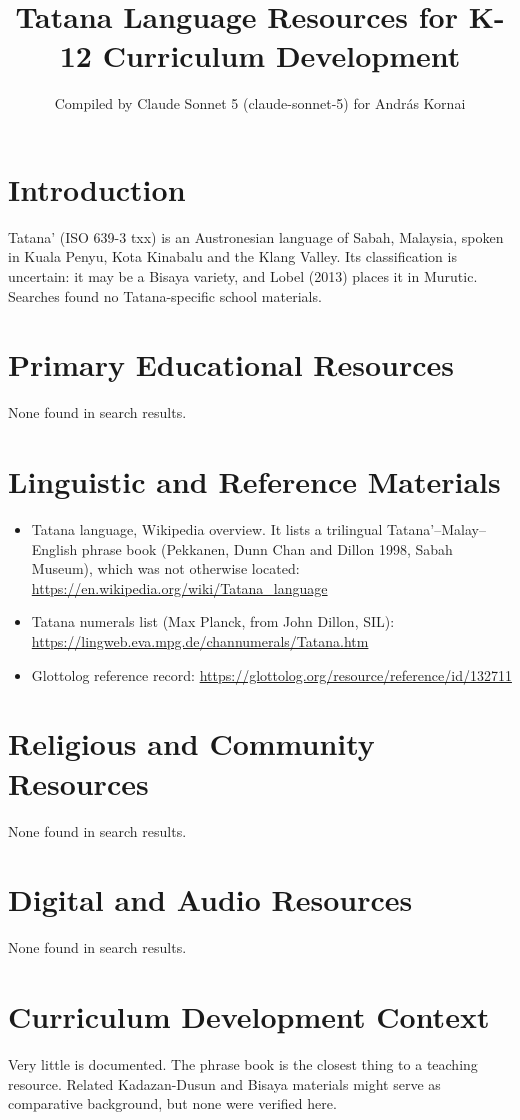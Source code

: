 \documentclass[12pt]{article}
\title{Tatana Language Resources for K-12 Curriculum Development}
\author{Compiled by Claude Sonnet 5 (claude-sonnet-5) for Andr\'as Kornai}
\date{}
\begin{document}
\maketitle
\section{Introduction}
Tatana' (ISO 639-3 txx) is an Austronesian language of Sabah, Malaysia, spoken in Kuala Penyu, Kota Kinabalu and the Klang Valley. Its classification is uncertain: it may be a Bisaya variety, and Lobel (2013) places it in Murutic. Searches found no Tatana-specific school materials.
\section{Primary Educational Resources}
None found in search results.
\section{Linguistic and Reference Materials}
\begin{itemize}
\item Tatana language, Wikipedia overview. It lists a trilingual Tatana'--Malay--English phrase book (Pekkanen, Dunn Chan and Dillon 1998, Sabah Museum), which was not otherwise located: \url{https://en.wikipedia.org/wiki/Tatana_language}
\item Tatana numerals list (Max Planck, from John Dillon, SIL): \url{https://lingweb.eva.mpg.de/channumerals/Tatana.htm}
\item Glottolog reference record: \url{https://glottolog.org/resource/reference/id/132711}
\end{itemize}
\section{Religious and Community Resources}
None found in search results.
\section{Digital and Audio Resources}
None found in search results.
\section{Curriculum Development Context}
Very little is documented. The phrase book is the closest thing to a teaching resource. Related Kadazan-Dusun and Bisaya materials might serve as comparative background, but none were verified here.
\end{document}
